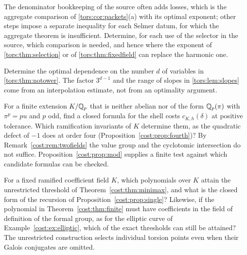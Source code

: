 \begin{question}\label{tors:q:objective}
The denominator bookkeeping of the source often adds losses, which is the aggregate
comparison of \cref{tors:cor:packets}(a) with its optimal exponent; other steps impose a
separate inequality for each Selmer datum, for which the aggregate theorem is
insufficient. Determine, for each use of the selector in the source, which comparison is
needed, and hence where the exponent of \cref{tors:thm:selection} or of
\cref{tors:thm:fixedfield} can replace the harmonic one.
\end{question}

\begin{question}\label{tors:q:dimension}
Determine the optimal dependence on the number $d$ of variables in
\cref{tors:thm:notower}. The factor $3^{d-1}$ and the range of slopes in
\cref{tors:lem:slopes} come from an interpolation estimate, not from an optimality
argument.
\end{question}

\begin{question}\label{cost:q:field}
For a finite extension $K/\mathbb{Q}_p$ that is neither abelian nor of the form $\mathbb{Q}_p(\pi)$ with
$\pi^p=pu$ and $p$ odd, find a closed formula for the shell costs $c_{K,h}(\delta)$ at
positive tolerance. Which ramification invariants of $K$ determine them, as the quadratic
defect of $-1$ does at order four (Proposition~\ref{cost:prop:fourth})? By Remark~\ref{cost:rem:twofields}
the value group and the cyclotomic intersection do not suffice.
Proposition~\ref{cost:prop:mod} supplies a finite test against which candidate formulas can be checked.
\end{question}

\begin{question}\label{cost:q:single}
For a fixed ramified coefficient field $K$, which polynomials over $K$ attain the
unrestricted threshold of Theorem~\ref{cost:thm:minimax}, and what is the closed form of the
recursion of Proposition~\ref{cost:prop:single}? Likewise, if the polynomial in Theorem~\ref{cost:thm:finite}
must have coefficients in the field of definition of the formal group, as for the elliptic
curve of Example~\ref{cost:ex:elliptic}, which of the exact thresholds can still be attained? The
unrestricted construction selects individual torsion points even when their Galois
conjugates are omitted.
\end{question}


